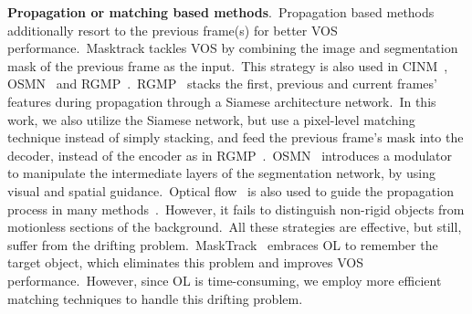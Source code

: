 \documentclass[10pt,twocolumn,letterpaper]{article}
\begin{document}
\noindent
{\bf Propagation or matching based methods}.\ Propagation based methods additionally resort to the previous frame(s) for better VOS performance.\ Masktrack\cite{masktrack} tackles VOS by combining the image and segmentation mask of the previous frame as the input.\ This strategy is also used in CINM~\cite{cinm}, OSMN~\cite{osmn} and RGMP~\cite{rgmp}.\ 
RGMP~\cite{rgmp} stacks the first, previous and current frames' features during propagation through a Siamese architecture network.\ In this work, we also utilize the Siamese network, but use a pixel-level matching technique instead of simply stacking, and feed the previous frame's mask into the decoder, instead of the encoder as in RGMP~\cite{rgmp}.\ OSMN~\cite{osmn} introduces a modulator to manipulate the intermediate layers of the segmentation network, by using visual and spatial guidance.\
Optical flow~\cite{flownet,flownet2} is also used to guide the propagation process in many methods~\cite{sfl,masktrack,ofl,ctn}.\ However, it fails to distinguish non-rigid objects from motionless sections of the background.\ All these strategies are effective, but still, suffer from the drifting problem.\ MaskTrack~\cite{masktrack} embraces OL to remember the target object, which eliminates this problem and improves VOS performance.\ However, since OL is time-consuming, we employ more efficient matching techniques to handle this drifting problem.
\end{document}
